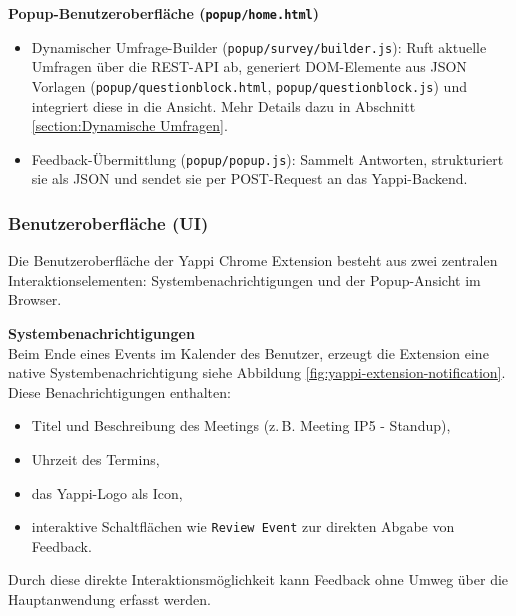 \documentclass[12pt,a4paper]{report}
\begin{document}
        \textbf{Popup-Benutzeroberfläche (\texttt{popup/home.html})} \\
            \begin{itemize}
              \item Dynamischer Umfrage-Builder (\texttt{popup/survey/builder.js}):
                    Ruft aktuelle Umfragen über die REST-API ab, generiert DOM-Elemente aus JSON Vorlagen (\texttt{popup/questionblock.html},
                    \texttt{popup/questionblock.js}) und integriert diese in die Ansicht.
                    Mehr Details dazu in Abschnitt \ref{section:Dynamische Umfragen}.
              \item Feedback-Übermittlung (\texttt{popup/popup.js}):
                    Sammelt Antworten, strukturiert sie als JSON und sendet sie per POST-Request an das Yappi-Backend.
            \end{itemize}


    \subsubsection{Benutzeroberfläche (UI)}
        Die Benutzeroberfläche der Yappi Chrome Extension besteht aus zwei zentralen Interaktionselementen: Systembenachrichtigungen und der Popup-Ansicht im Browser.

        \textbf{Systembenachrichtigungen} \\
            Beim Ende eines Events im Kalender des Benutzer, erzeugt die Extension eine native Systembenachrichtigung siehe Abbildung \ref{fig:yappi-extension-notification}.
            Diese Benachrichtigungen enthalten:
            \begin{itemize}
                \item Titel und Beschreibung des Meetings (z.\,B. \glqq Meeting IP5 - Standup\grqq),
                \item Uhrzeit des Termins,
                \item das Yappi-Logo als Icon,
                \item interaktive Schaltflächen wie \texttt{Review Event} zur direkten Abgabe von Feedback.
            \end{itemize}
            Durch diese direkte Interaktionsmöglichkeit kann Feedback ohne Umweg über die Hauptanwendung erfasst werden.
\end{document}
